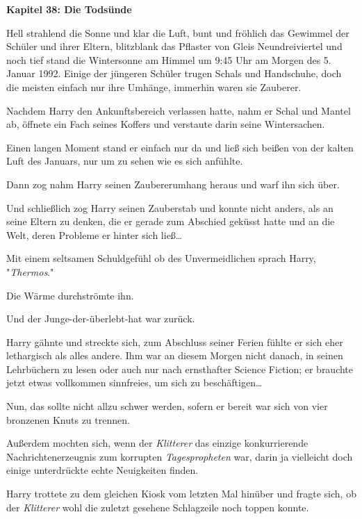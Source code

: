 

\hypertarget{die-todsuxfcnde}{%

\textbf{Kapitel 38: Die Todsünde}

Hell strahlend die Sonne und klar die Luft, bunt und fröhlich das Gewimmel der Schüler und ihrer Eltern, blitzblank das Pflaster von Gleis Neundreiviertel und noch tief stand die Wintersonne am Himmel um 9:45 Uhr am Morgen des 5. Januar 1992. Einige der jüngeren Schüler trugen Schals und Handschuhe, doch die meisten einfach nur ihre Umhänge, immerhin waren sie Zauberer.

Nachdem Harry den Ankunftsbereich verlassen hatte, nahm er Schal und Mantel ab, öffnete ein Fach seines Koffers und verstaute darin seine Wintersachen.

Einen langen Moment stand er einfach nur da und ließ sich beißen von der kalten Luft des Januars, nur um zu sehen wie es sich anfühlte.

Dann zog nahm Harry seinen Zaubererumhang heraus und warf ihn sich über.

Und schließlich zog Harry seinen Zauberstab und konnte nicht anders, als an seine Eltern zu denken, die er gerade zum Abschied geküsst hatte und an die Welt, deren Probleme er hinter sich ließ…

Mit einem seltsamen Schuldgefühl ob des Unvermeidlichen sprach Harry, "\emph{Thermos}."

Die Wärme durchströmte ihn.

Und der Junge-der-überlebt-hat war zurück.

Harry gähnte und streckte sich, zum Abschluss seiner Ferien fühlte er sich eher lethargisch als alles andere. Ihm war an diesem Morgen nicht danach, in seinen Lehrbüchern zu lesen oder auch nur nach ernsthafter Science Fiction; er brauchte jetzt etwas vollkommen sinnfreies, um sich zu beschäftigen…

Nun, das sollte nicht allzu schwer werden, sofern er bereit war sich von vier bronzenen Knuts zu trennen.

Außerdem mochten sich, wenn der \emph{Klitterer} das einzige konkurrierende Nachrichtenerzeugnis zum korrupten \emph{Tagespropheten} war, darin ja vielleicht doch einige unterdrückte echte Neuigkeiten finden.

Harry trottete zu dem gleichen Kiosk vom letzten Mal hinüber und fragte sich, ob der \emph{Klitterer} wohl die zuletzt gesehene Schlagzeile noch toppen konnte.

}
